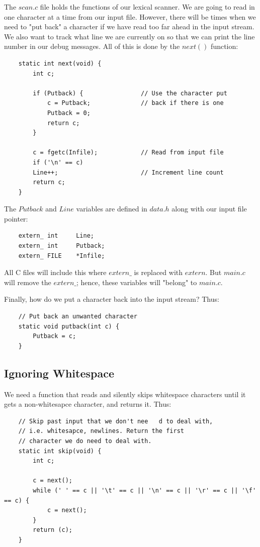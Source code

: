 \documentclass[journal, onecolumn, 12pt]{IEEEtran}
\begin{document}
The $scan.c$ file holds the functions of our lexical scanner. We are going to read in one character at a time from our input file. However, there will be times when we need to "put back" a character if we have read too far ahead in the input stream. We also want to track what line we are currently on so that we can print the line number in our debug messages. All of this is done by the $next()$ function:

\begin{lstlisting}
    static int next(void) {
        int c;

        if (Putback) {                // Use the character put
            c = Putback;              // back if there is one
            Putback = 0;
            return c;
        }

        c = fgetc(Infile);            // Read from input file
        if ('\n' == c)
        Line++;                       // Increment line count
        return c;
    }
\end{lstlisting}

The $Putback$ and $Line$ variables are defined in $data.h$ along with our input file pointer:

\begin{lstlisting}
    extern_ int     Line;
    extern_ int     Putback;
    extern_ FILE    *Infile;
\end{lstlisting}

All C files will include this where $extern\_$ is replaced with $extern$. But $main.c$ will remove the $extern\_$; hence, these variables will "belong" to $main.c$.

Finally, how do we put a character back into the input stream? Thus:

\begin{lstlisting}
    // Put back an unwanted character
    static void putback(int c) {
        Putback = c;
    }
\end{lstlisting}

\subsection{Ignoring Whitespace}

We need a function that reads and silently skips whitespace characters until it gets a non-whitesapce character, and returns it. Thus:

\begin{lstlisting}
    // Skip past input that we don't nee   d to deal with,
    // i.e. whitesapce, newlines. Return the first
    // character we do need to deal with.
    static int skip(void) {
        int c;

        c = next();
        while (' ' == c || '\t' == c || '\n' == c || '\r' == c || '\f' == c) {
            c = next();
        }
        return (c);
    }
\end{lstlisting}
\end{document}
